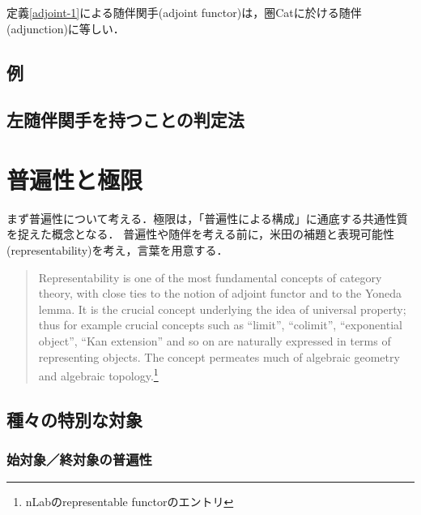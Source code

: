 \documentclass[uplatex, dvipdfmx]{jsreport}
\begin{document}
\begin{definition}
    
\end{definition}

\begin{proposition}
    定義\ref{adjoint-1}による随伴関手(adjoint functor)は，圏Catに於ける随伴(adjunction)に等しい．
\end{proposition}

\section{例}

\begin{example}[集合]
    
\end{example}

\section{左随伴関手を持つことの判定法}

\chapter{普遍性と極限}
まず普遍性について考える．極限は，「普遍性による構成」に通底する共通性質を捉えた概念となる．
普遍性や随伴を考える前に，米田の補題と表現可能性(representability)を考え，言葉を用意する．
\begin{quotation}
    Representability is one of the most fundamental concepts of category theory, with close ties to the notion of adjoint functor and to the Yoneda lemma.
    It is the crucial concept underlying the idea of universal property; thus for example crucial concepts such as “limit”, “colimit”, “exponential object”, “Kan extension” and so on are naturally expressed in terms of representing objects.
    The concept permeates much of algebraic geometry and algebraic topology.\footnote{nLabのrepresentable functorのエントリ}
\end{quotation}


\section{種々の特別な対象}

\subsection{始対象／終対象の普遍性}
\end{document}

